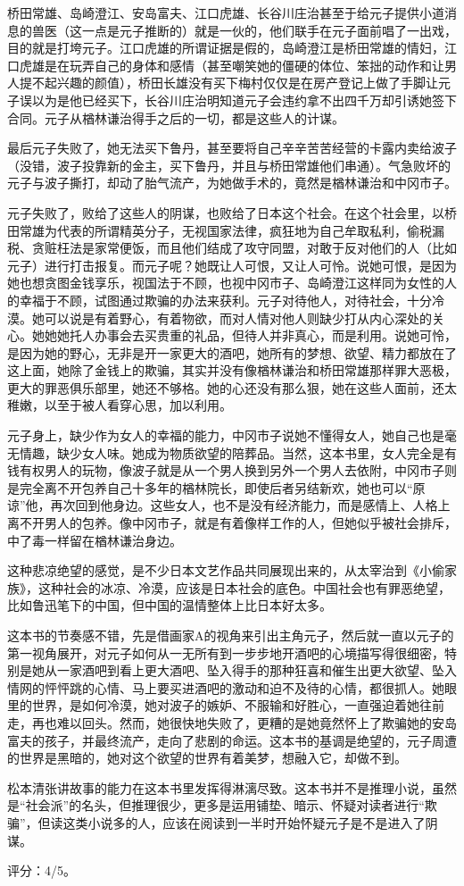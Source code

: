 桥田常雄、岛崎澄江、安岛富夫、江口虎雄、长谷川庄治甚至于给元子提供小道消息的兽医（这一点是元子推断的）就是一伙的，他们联手在元子面前唱了一出戏，目的就是打垮元子。江口虎雄的所谓证据是假的，岛崎澄江是桥田常雄的情妇，江口虎雄是在玩弄自己的身体和感情（甚至嘲笑她的僵硬的体位、笨拙的动作和让男人提不起兴趣的颜值），桥田长雄没有买下梅村仅仅是在房产登记上做了手脚让元子误以为是他已经买下，长谷川庄治明知道元子会违约拿不出四千万却引诱她签下合同。元子从楢林谦治得手之后的一切，都是这些人的计谋。

最后元子失败了，她无法买下鲁丹，甚至要将自己辛辛苦苦经营的卡露内卖给波子（没错，波子投靠新的金主，买下鲁丹，并且与桥田常雄他们串通）。气急败坏的元子与波子撕打，却动了胎气流产，为她做手术的，竟然是楢林谦治和中冈市子。

元子失败了，败给了这些人的阴谋，也败给了日本这个社会。在这个社会里，以桥田常雄为代表的所谓精英分子，无视国家法律，疯狂地为自己牟取私利，偷税漏税、贪赃枉法是家常便饭，而且他们结成了攻守同盟，对敢于反对他们的人（比如元子）进行打击报复。而元子呢？她既让人可恨，又让人可怜。说她可恨，是因为她也想贪图金钱享乐，视国法于不顾，也视中冈市子、岛崎澄江这样同为女性的人的幸福于不顾，试图通过欺骗的办法来获利。元子对待他人，对待社会，十分冷漠。她可以说是有着野心，有着物欲，而对人情对他人则缺少打从内心深处的关心。她她她托人办事会去买贵重的礼品，但待人并非真心，而是利用。说她可怜，是因为她的野心，无非是开一家更大的酒吧，她所有的梦想、欲望、精力都放在了这上面，她除了金钱上的欺骗，其实并没有像楢林谦治和桥田常雄那样罪大恶极，更大的罪恶俱乐部里，她还不够格。她的心还没有那么狠，她在这些人面前，还太稚嫩，以至于被人看穿心思，加以利用。

元子身上，缺少作为女人的幸福的能力，中冈市子说她不懂得女人，她自己也是毫无情趣，缺少女人味。她成为物质欲望的陪葬品。当然，这本书里，女人完全是有钱有权男人的玩物，像波子就是从一个男人换到另外一个男人去依附，中冈市子则是完全离不开包养自己十多年的楢林院长，即使后者另结新欢，她也可以“原谅”他，再次回到他身边。这些女人，也不是没有经济能力，而是感情上、人格上离不开男人的包养。像中冈市子，就是有着像样工作的人，但她似乎被社会排斥，中了毒一样留在楢林谦治身边。

这种悲凉绝望的感觉，是不少日本文艺作品共同展现出来的，从太宰治到《小偷家族》，这种社会的冰凉、冷漠，应该是日本社会的底色。中国社会也有罪恶绝望，比如鲁迅笔下的中国，但中国的温情整体上比日本好太多。

这本书的节奏感不错，先是借画家A的视角来引出主角元子，然后就一直以元子的第一视角展开，对元子如何从一无所有到一步步地开酒吧的心境描写得很细密，特别是她从一家酒吧到看上更大酒吧、坠入得手的那种狂喜和催生出更大欲望、坠入情网的怦怦跳的心情、马上要买进酒吧的激动和迫不及待的心情，都很抓人。她眼里的世界，是如何冷漠，她对波子的嫉妒、不服输和好胜心，一直强迫着她往前走，再也难以回头。然而，她很快地失败了，更糟的是她竟然怀上了欺骗她的安岛富夫的孩子，并最终流产，走向了悲剧的命运。这本书的基调是绝望的，元子周遭的世界是黑暗的，她对这个欲望的世界有着美梦，想融入它，却做不到。

松本清张讲故事的能力在这本书里发挥得淋漓尽致。这本书并不是推理小说，虽然是“社会派”的名头，但推理很少，更多是运用铺垫、暗示、怀疑对读者进行“欺骗”，但读这类小说多的人，应该在阅读到一半时开始怀疑元子是不是进入了阴谋。

评分：4/5。